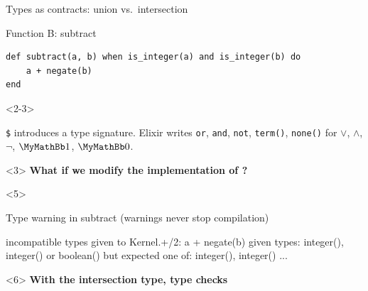 \begin{frame}[fragile,t]{Types as contracts: union vs.\ intersection}
\vspace{-2mm}
\begin{block}{}
\vspace{-2.1mm}
\negateInt
\vspace{-2.1mm}
\vspace{-2.2mm}
\end{block}
\begin{block}{Function B: subtract}
\vspace{-1mm}
\vspace{-2.1mm}
\begin{verbatim}
def subtract(a, b) when is_integer(a) and is_integer(b) do
    a + negate(b)
end
\end{verbatim}
\end{block}
\begin{onlyenv}<2-3>
{\small\color{gray}\texttt{\$} introduces a type signature. Elixir writes
\texttt{or}, \texttt{and}, \texttt{not}, \texttt{term()}, \texttt{none()} for
$\vee$, $\wedge$, $\neg$, $\Any$, $\Empty$.\par}
\end{onlyenv}
\begin{onlyenv}<3>
\smallskip
\textbf{\color{darkslateblue}What if we modify the implementation of ?}
\end{onlyenv}
\begin{onlyenv}<5>
\begin{block}{Type warning in subtract {\normalfont\small(warnings never stop compilation)}}
\begin{warnverbatim}
\warn incompatible types given to Kernel.+/2: a + negate(b)
given types: integer(), integer() or boolean()
but expected one of: integer(), integer()  ...
\end{warnverbatim}
\vspace{-2.5mm}
\end{block}
\end{onlyenv}
\begin{onlyenv}<6>
\textbf{\color{darkslateblue}With the intersection type,  type checks}
\end{onlyenv}
\end{frame}


